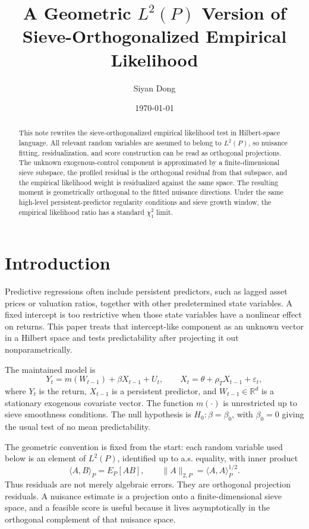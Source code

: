 ﻿\documentclass[11pt]{article}
\title{A Geometric \(L^2(P)\) Version of Sieve-Orthogonalized Empirical Likelihood}
\author{Siyan Dong}
\date{\today}
\begin{document}
\maketitle

\begin{abstract}
This note rewrites the sieve-orthogonalized empirical likelihood test in Hilbert-space language. All relevant random variables are assumed to belong to \(L^2(P)\), so nuisance fitting, residualization, and score construction can be read as orthogonal projections. The unknown exogenous-control component is approximated by a finite-dimensional sieve subspace, the profiled residual is the orthogonal residual from that subspace, and the empirical likelihood weight is residualized against the same space. The resulting moment is geometrically orthogonal to the fitted nuisance directions. Under the same high-level persistent-predictor regularity conditions and sieve growth window, the empirical likelihood ratio has a standard \(\chi_1^2\) limit.
\end{abstract}

\section{Introduction}

Predictive regressions often include persistent predictors, such as lagged asset prices or valuation ratios, together with other predetermined state variables. A fixed intercept is too restrictive when those state variables have a nonlinear effect on returns. This paper treats that intercept-like component as an unknown vector in a Hilbert space and tests predictability after projecting it out nonparametrically.

The maintained model is
\begin{equation}
    Y_t=m(W_{t-1})+\beta X_{t-1}+U_t,
    \qquad
    X_t=\theta+\rho_T X_{t-1}+\varepsilon_t,
    \label{eq:geo-intro-dgp}
\end{equation}
where \(Y_t\) is the return, \(X_{t-1}\) is a persistent predictor, and \(W_{t-1}\in\mathbb R^d\) is a stationary exogenous covariate vector. The function \(m(\cdot)\) is unrestricted up to sieve smoothness conditions. The null hypothesis is \(H_0:\beta=\beta_0\), with \(\beta_0=0\) giving the usual test of no mean predictability.

The geometric convention is fixed from the start: each random variable used below is an element of \(L^2(P)\), identified up to a.s. equality, with inner product
\[
    \langle A,B\rangle_P=E_P[AB],
    \qquad
    \|A\|_{2,P}=\langle A,A\rangle_P^{1/2}.
\]
Thus residuals are not merely algebraic errors. They are orthogonal projection residuals. A nuisance estimate is a projection onto a finite-dimensional sieve space, and a feasible score is useful because it lives asymptotically in the orthogonal complement of that nuisance space.
\end{document}
